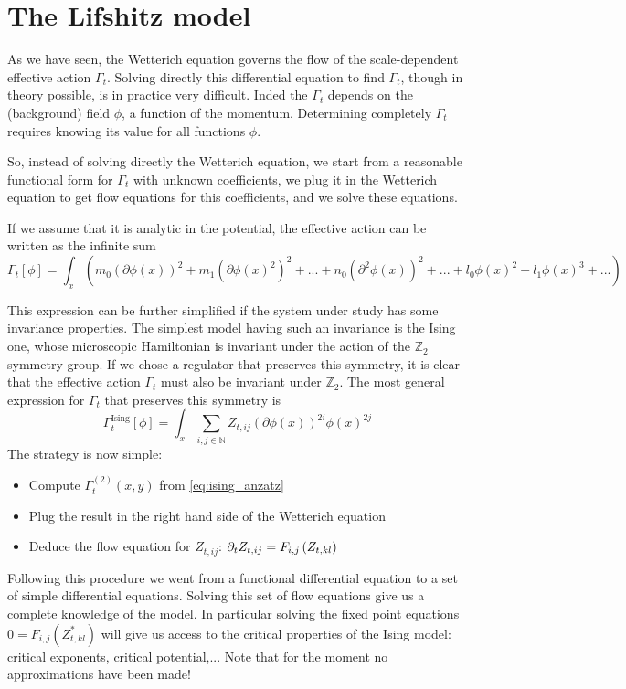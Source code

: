 \chapter{The Lifshitz model}

As we have seen, the Wetterich equation governs the flow of the scale-dependent effective action $\Gamma_t$. Solving directly this differential equation to find $\Gamma_t$, though in theory possible, is in practice very difficult. Inded the $\Gamma_t$ depends on the (background) field $\phi$, a function of the momentum. Determining completely $\Gamma_t$ requires knowing its value for all functions $\phi$. 

So, instead of solving directly the Wetterich equation, we start from a reasonable functional form for $\Gamma_t$ with unknown coefficients, we plug it in the Wetterich equation to get flow equations for this coefficients, and we solve these equations.

If we assume that it is analytic in the potential, the effective action can be written as the infinite sum
\begin{equation}
\Gamma_t[\phi] = \int_{x} \left( m_0 (\partial \phi(x))^2 + m_1 (\partial \phi(x)^2)^2 + ... + n_0 (\partial^2 \phi(x))^2 + ... + l_0 \phi(x)^2 + l_1 \phi(x)^3 +... \right)
\end{equation}

This expression can be further simplified if the system under study has some invariance properties. The simplest model having such an invariance is the Ising one, whose microscopic Hamiltonian is invariant under the action of the $\mathds{Z}_2$ symmetry group. If we chose a regulator that preserves this symmetry, it is clear that the effective action $\Gamma_t$ must also be invariant under $\mathds{Z}_2$. The most general expression for $\Gamma_t$ that preserves this symmetry is
\begin{equation}
\label{eq:ising_anzatz}
\Gamma_t^{\text{Ising}}[\phi] = \int_{x} \sum_{i,j \in \mathds{N}} Z_{t,ij} (\partial \phi(x))^{2i} \phi(x)^{2 j}
\end{equation}
The strategy is now simple:
\begin{itemize}
\item Compute $\Gamma_t^{(2)}(x,y)$ from \ref{eq:ising_anzatz}
\item Plug the result in the right hand side of the Wetterich equation
\item Deduce the flow equation for $Z_{t,ij}$: $\partial_{t} Z_{t,ij} = F_{i,j}\left( {Z_{t,kl}} \right)$
\end{itemize}
Following this procedure we went from a functional differential equation to a set of simple differential equations. Solving this set of flow equations give us a complete knowledge of the model. In particular solving the fixed point equations $0 = F_{i,j}\left( {Z^*_{t,kl}} \right)$ will give us access to the critical properties of the Ising model: critical exponents, critical potential,... Note that for the moment no approximations have been made!

